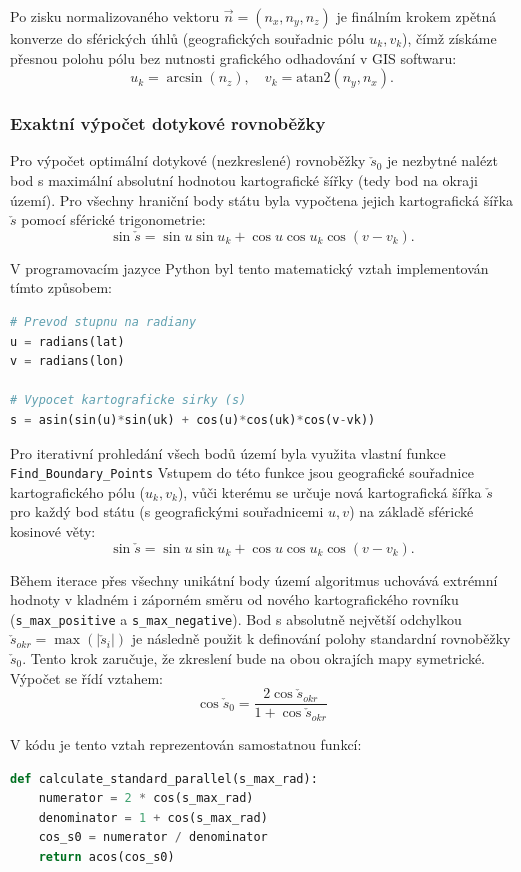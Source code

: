 Po zisku normalizovaného vektoru $\vec{n} = (n_x, n_y, n_z)$ je finálním krokem zpětná konverze do sférických úhlů (geografických souřadnic pólu $u_k, v_k$), čímž získáme přesnou polohu pólu bez nutnosti grafického odhadování v GIS softwaru:
$$ u_k = \arcsin(n_z), \quad v_k = \text{atan2}(n_y, n_x). $$

\subsubsection*{Exaktní výpočet dotykové rovnoběžky}
Pro výpočet optimální dotykové (nezkreslené) rovnoběžky $\check{s}_0$ je nezbytné nalézt bod s maximální absolutní hodnotou kartografické šířky (tedy bod na okraji území). Pro všechny hraniční body státu byla vypočtena jejich kartografická šířka $\check{s}$ pomocí sférické trigonometrie:
$$ \sin \check{s} = \sin u \sin u_k + \cos u \cos u_k \cos(v - v_k). $$

V programovacím jazyce Python byl tento matematický vztah implementován tímto způsobem:

\begin{lstlisting}[language=Python, caption=Výpočet kartografické šířky.]
# Prevod stupnu na radiany
u = radians(lat)
v = radians(lon)

# Vypocet kartograficke sirky (s)
s = asin(sin(u)*sin(uk) + cos(u)*cos(uk)*cos(v-vk))
\end{lstlisting}

Pro iterativní prohledání všech bodů území byla využita vlastní funkce \lstinline{Find_Boundary_Points} Vstupem do této funkce jsou geografické souřadnice kartografického pólu ($u_k, v_k$), vůči kterému se určuje nová kartografická šířka $\check{s}$ pro každý bod státu (s geografickými souřadnicemi $u, v$) na základě sférické kosinové věty:
$$ \sin \check{s} = \sin u \sin u_k + \cos u \cos u_k \cos(v - v_k). $$


Během iterace přes všechny unikátní body území algoritmus uchovává extrémní hodnoty v kladném i záporném směru od nového kartografického rovníku (\lstinline{s_max_positive} a \lstinline{s_max_negative}). 
Bod s absolutně největší odchylkou $\check{s}_{okr} = \max(|\check{s}_i|)$ je následně použit k definování polohy standardní rovnoběžky $\check{s}_0$. Tento krok zaručuje, že zkreslení bude na obou okrajích mapy symetrické. Výpočet se řídí vztahem:
$$ \cos \check{s}_0 = \frac{2 \cos \check{s}_{okr}}{1 + \cos \check{s}_{okr}} $$

V kódu je tento vztah reprezentován samostatnou funkcí:
\begin{lstlisting}[language=Python, caption=Výpočet dotykové rovnoběžky.]
def calculate_standard_parallel(s_max_rad):
    numerator = 2 * cos(s_max_rad)
    denominator = 1 + cos(s_max_rad)
    cos_s0 = numerator / denominator
    return acos(cos_s0)
\end{lstlisting}

